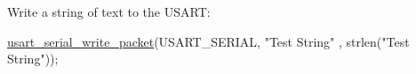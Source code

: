 \begin{DoxyEnumerate}
\item Write a string of text to the U\-S\-A\-R\-T\-:
\begin{DoxyItemize}
\item 
\begin{DoxyCode}
 \hyperlink{usart__serial_8h_af9393f1fa29d87970159fabd511b7de1}{usart\_serial\_write\_packet}(USART\_SERIAL, \textcolor{stringliteral}{"Test String"}
      , strlen(\textcolor{stringliteral}{"Test String"})); 
\end{DoxyCode}
 
\end{DoxyItemize}
\end{DoxyEnumerate}